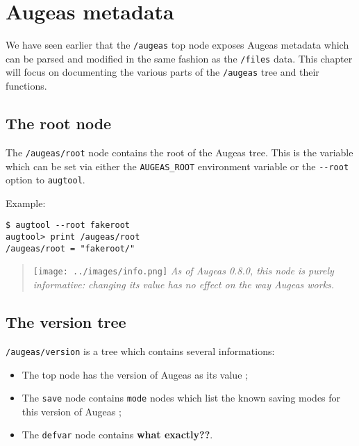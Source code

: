 \chapter{Augeas metadata}

 

We have seen earlier that the \verb!/augeas! top node exposes Augeas metadata which can be parsed and modified in the same fashion as the \verb!/files! data. This chapter will focus on documenting the various parts of the \verb!/augeas! tree and their functions.

\section{The root node}

  

The \verb!/augeas/root! node contains the root of the Augeas tree. This is the variable which can be set via either the \verb!AUGEAS_ROOT! environment variable or the \verb!--root! option to \verb!augtool!.


Example:

\begin{verbatim}
$ augtool --root fakeroot
augtool> print /augeas/root
/augeas/root = "fakeroot/"
\end{verbatim}
\begin{quote}
\texttt{[image: ../images/info.png]} \emph{As of Augeas 0.8.0, this node is purely informative: changing its value has no effect on the way Augeas works.}

\end{quote}
\section{The version tree}


\verb!/augeas/version! is a tree which contains several informations:

\begin{itemize}
\item
  The top node has the version of Augeas as its value ;
\item
  The \verb!save! node contains \verb!mode! nodes which list the known saving modes for this version of Augeas ;
\item
  The \verb!defvar! node contains \textbf{what exactly??}.
\end{itemize}

